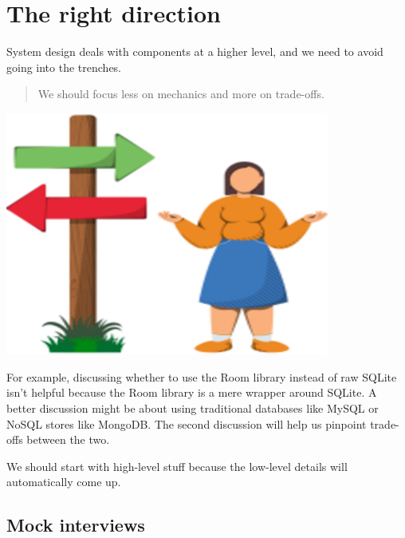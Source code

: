 \noindent
\begin{minipage}[t]{0.48\textwidth}
\section{The right direction}\label{the-right-direction}

System design deals with components at a higher level, and we need to avoid going into the trenches.
\begin{quote}
We should focus less on mechanics and more on trade-offs.
\end{quote}
\end{minipage}
\hfill
\begin{minipage}[t]{0.48\textwidth}
\includegraphics[width=0.8\textwidth]{Images/chapter_1/section_5546916426809344/6189662928764928.png}
\end{minipage}

For example, discussing whether to use the Room library instead of raw SQLite isn't helpful because the Room library is a mere wrapper around SQLite. A better discussion might be about using traditional databases like MySQL or NoSQL stores like MongoDB. The second discussion will help us pinpoint trade-offs between the two.

We should start with high-level stuff because the low-level details will automatically come up.

\subsection{Mock interviews}\label{_iBmPbw-jK71Gt4hITmkT}

